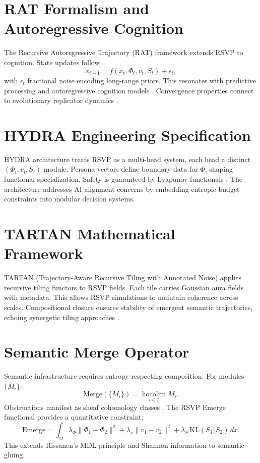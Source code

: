 \section{RAT Formalism and Autoregressive Cognition}
The Recursive Autoregressive Trajectory (RAT) framework extends RSVP to cognition. State updates follow
\[
x_{t+1} = f(x_t,\Phi_t,v_t,S_t) + \epsilon_t,
\]
with $\epsilon_t$ fractional noise encoding long-range priors. This resonates with predictive processing \cite{Hohwy2013,Friston:2009ze} and autoregressive cognition models \cite{Hinton2006,LeCun2015}. Convergence properties connect to evolutionary replicator dynamics \cite{TaylorJonker1978,HofbauerSigmund1998}.

\section{HYDRA Engineering Specification}
HYDRA architecture treats RSVP as a multi-head system, each head a distinct $(\Phi_i,v_i,S_i)$ module. Persona vectors define boundary data for $\Phi$, shaping functional specialization. Safety is guaranteed by Lyapunov functionals \cite{Ashby1956,Wiener1948}. The architecture addresses AI alignment concerns \cite{Bostrom2014,Russell2019} by embedding entropic budget constraints into modular decision systems.

\section{TARTAN Mathematical Framework}
TARTAN (Trajectory-Aware Recursive Tiling with Annotated Noise) applies recursive tiling functors to RSVP fields. Each tile carries Gaussian aura fields with metadata. This allows RSVP simulations to maintain coherence across scales. Compositional closure ensures stability of emergent semantic trajectories, echoing synergetic tiling approaches \cite{Haken1983}.

\section{Semantic Merge Operator}
Semantic infrastructure requires entropy-respecting composition. For modules $\{M_i\}$:
\[
\mathrm{Merge}(\{M_i\}) = \operatorname*{hocolim}_{i\in I} M_i.
\]
Obstructions manifest as sheaf cohomology classes \cite{MacLane1998,BaezStay2010}. The RSVP Emerge functional provides a quantitative constraint:
\[
\mathrm{Emerge}=\int_\Omega \lambda_\Phi\|\Phi_1-\Phi_2\|^2+\lambda_v\|v_1-v_2\|^2+\lambda_S\,\mathrm{KL}(S_1\Vert S_2)\,dx.
\]
This extends Rissanen’s MDL principle \cite{rissanen1978} and Shannon information \cite{Shannon1948,CoverThomas2006} to semantic gluing.

